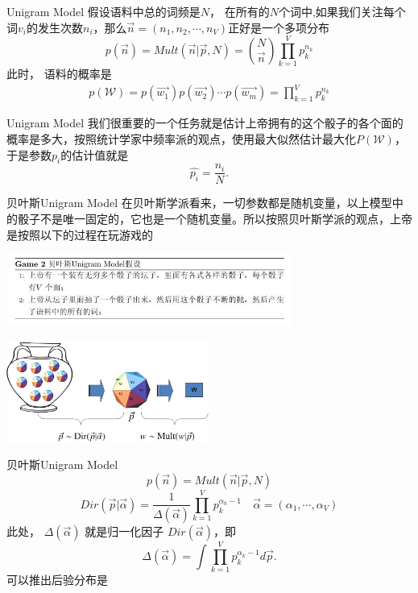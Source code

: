 \documentclass{beamer}
\begin{document}
\begin{CJK*}{UTF8}{gbsn}
\begin{frame}{Unigram Model}
假设语料中总的词频是$N$， 在所有的$N$个词中,如果我们关注每个词$v_i$的发生次数$n_i$，那么$\overrightarrow{n}=(n_1, n_2,\cdots, n_V)$正好是一个多项分布$$ p(\overrightarrow{n}) = Mult(\overrightarrow{n}|\overrightarrow{p}, N) = \binom{N}{\overrightarrow{n}} \prod_{k=1}^V p_k^{n_k} $$
此时， 语料的概率是
\begin{align*}
p(\mathcal{W})= p(\overrightarrow{w_1})p(\overrightarrow{w_2}) \cdots p(\overrightarrow{w_m})
= \prod_{k=1}^V p_k^{n_k}
\end{align*}
\end{frame}


\begin{frame}{Unigram Model}
我们很重要的一个任务就是估计上帝拥有的这个骰子的各个面的概率是多大，按照统计学家中频率派的观点，使用最大似然估计最大化$P(\mathcal{W})$，于是参数$p_i$的估计值就是$$ \hat{p_i} = \frac{n_i}{N} .$$
\end{frame}

\begin{frame}{贝叶斯Unigram Model}
在贝叶斯学派看来，一切参数都是随机变量，以上模型中的骰子不是唯一固定的，它也是一个随机变量。所以按照贝叶斯学派的观点，上帝是按照以下的过程在玩游戏的
\begin{center}
      \includegraphics[width=0.7\textwidth]{picture/gm2.jpeg}
\end{center} 

\begin{center}
      \includegraphics[width=0.5\textwidth]{picture/gm2p.jpeg}
\end{center} 
\end{frame}

\begin{frame}{贝叶斯Unigram Model}
$$ p(\overrightarrow{n}) = Mult(\overrightarrow{n}|\overrightarrow{p}, N) $$
$$ Dir(\overrightarrow{p}|\overrightarrow{\alpha})= \frac{1}{\Delta(\overrightarrow{\alpha})} \prod_{k=1}^V p_k^{\alpha_k -1}\quad \overrightarrow{\alpha}=
(\alpha_1, \cdots, \alpha_V) $$
此处，
$\Delta(\overrightarrow{\alpha})$
就是归一化因子
$Dir(\overrightarrow{\alpha})$，即
$$ \Delta(\overrightarrow{\alpha}) = \int \prod_{k=1}^V p_k^{\alpha_k -1} d\overrightarrow{p} . $$
可以推出后验分布是


\end{frame}
\end{CJK*}
\end{document}
